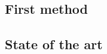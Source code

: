 \begin{fullwidth}
\part[FIRST METHOD]{First method}

\chapter[STATE OF THE ART]{State of the art}
\label{chap:sota1}
\end{fullwidth}



